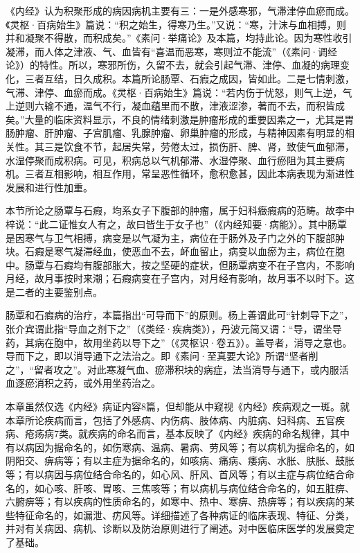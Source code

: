 \documentclass[draft,12pt]{ctexbook}
\begin{document}
《内经》认为积聚形成的病因病机主要有三：一是外感寒邪，气滞津停血瘀而成。《灵枢·百病始生》篇说：“积之始生，得寒乃生。”又说：“寒，汁沫与血相搏，则并和凝聚不得散，而积成矣。”《素问·举痛论》及本篇，均持此论。因为寒性收引凝滞，而人体之津液、气、血皆有“喜温而恶寒，寒则泣不能流”（《素问·调经论》）的特性。所以，寒邪所伤，久留不去，就会引起气滞、津停、血凝的病理变化，三者互结，日久成积。本篇所论肠覃、石瘕之成因，皆如此。二是七情刺激，气滞、津停、血瘀而成。《灵枢·百病始生》篇说：“若内伤于忧怒，则气上逆，气上逆则六输不通，温气不行，凝血蕴里而不散，津液涩渗，著而不去，而积皆成矣。”大量的临床资料显示，不良的情绪刺激是肿瘤形成的重要因素之一，尤其是胃肠肿瘤、肝肿瘤、子宫肌瘤、乳腺肿瘤、卵巢肿瘤的形成，与精神因素有明显的相关性。其三是饮食不节，起居失常，劳倦太过，损伤肝、脾、肾，致使气血郁滞，水湿停聚而成积病。可见，积病总以气机郁滞、水湿停聚、血行瘀阻为其主要病机。三者互相影响，相互作用，常呈恶性循环，愈积愈甚，因此本病表现为渐进性发展和进行性加重。

本节所论之肠覃与石瘕，均系女子下腹部的肿瘤，属于妇科癥瘕病的范畴。故李中梓说：“此二证惟女人有之，故曰皆生于女子也”（《内经知要·病能》）。其中肠覃是因寒气与卫气相搏，病变是以气凝为主，病位在于肠外及子门之外的下腹部肿块。石瘕是寒气凝滞经血，使恶血不去，衃血留止，病变以血瘀为主，病位在胞中。肠覃与石瘕均有腹部胀大，按之坚硬的症状，但肠覃病变不在子宫内，不影响月经，故月事按时来潮；石瘕病变在子宫内，对月经有影响，故月事不以时下。这是二者的主要鉴别点。


肠覃和石瘕病的治疗，本篇指出“可导而下”的原则。杨上善谓此可“针刺导下之”，张介宾谓此指“导血之剂下之”（《类经·疾病类》），丹波元简又谓：“导，谓坐导药，其病在胞中，故用坐药以导下之”（《灵枢识·卷五》）。盖导者，消导之意也。导而下之，即以消导通下之法治之。即《素问·至真要大论》所谓“坚者削之”，“留者攻之”。对此寒凝气血、瘀滞积块的病症，法当消导与通下，或内服活血逐瘀消积之药，或外用坐药治之。

\xiaojie

本章虽然仅选《内经》病证内容8篇，但却能从中窥视《内经》疾病观之一斑。就本章所论疾病而言，包括了外感病、内伤病、肢体病、内脏病、妇科病、五官疾病、疮疡病7类。就疾病的命名而言，基本反映了《内经》疾病的命名规律，其中有以病因为据命名的，如伤寒病、温病、暑病、劳风等；有以病机为据命名的，如阴阳交、痹病等；有以主症为据命名的，如咳病、痛病、痿病、水胀、肤胀、鼓胀等；有以病因与病位结合命名的，如心风、肝风、首风等；有以主症与病位结合命名的，如心咳、肝咳、胃咳、三焦咳等；有以病机与病位结合命名的，如五脏痹、六腑痹等；有以疾病的性质命名的，如寒中、热中、寒痹、热痹等；有以疾病的某些特征命名的，如漏泄、疠风等。详细描述了各种病证的临床表现、特征、分类，并对有关病因、病机、诊断以及防治原则进行了阐述。对中医临床医学的发展奠定了基础。

\ifx \allfiles \undefined
\end{document}
